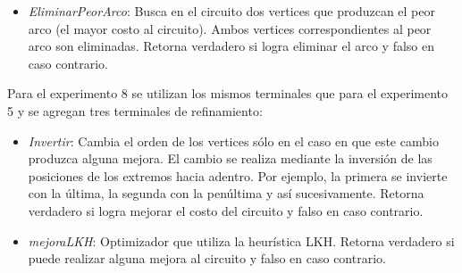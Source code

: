 \begin{itemize}
\item \textit{EliminarPeorArco}: Busca en el circuito dos vertices que produzcan el peor arco (el mayor costo al circuito). Ambos vertices correspondientes al peor arco son eliminadas. Retorna verdadero si logra eliminar el arco y falso en caso contrario.



\end{itemize}

Para el experimento 8 se utilizan los mismos terminales que para el experimento 5 y se agregan tres terminales de refinamiento:

\begin{itemize}

\item \textit{Invertir}: Cambia el orden de los vertices sólo en el caso en que este cambio produzca alguna mejora. El cambio se realiza mediante la inversión de las posiciones de los extremos hacia adentro. Por ejemplo, la primera se invierte con la última, la segunda con la penúltima y así sucesivamente. Retorna verdadero si logra mejorar el costo del circuito y falso en caso contrario.

\item \textit{mejoraLKH}: Optimizador que utiliza la heurística LKH. Retorna verdadero si puede realizar alguna mejora al circuito y falso en caso contrario.

\end{itemize}


